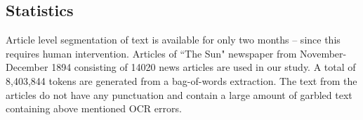 
\subsection{Statistics}
Article level segmentation of text is available for only two months -- since this requires human intervention. Articles of ``The Sun" newspaper from November-December 1894 consisting of 14020 news articles are used in our study. A total of 8,403,844 tokens are generated from a bag-of-words extraction. 
The text from the articles do not have any punctuation and contain a large amount of garbled text containing above mentioned OCR errors.


